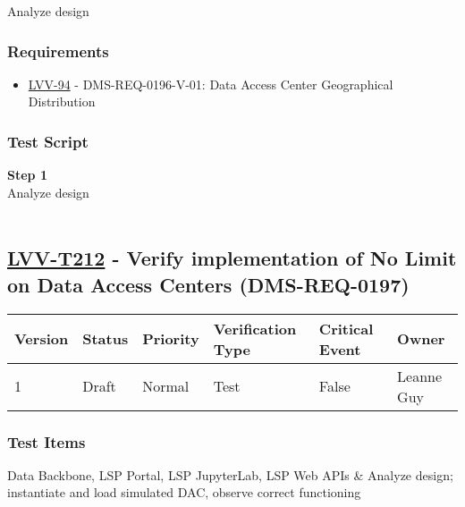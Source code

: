 Analyze design

\hypertarget{requirements-188}{%
\subsubsection{Requirements}\label{requirements-188}}

\begin{itemize}
\tightlist
\item
  \href{https://jira.lsstcorp.org/browse/LVV-94}{LVV-94} -
  DMS-REQ-0196-V-01: Data Access Center Geographical Distribution
\end{itemize}

\hypertarget{test-script-188}{%
\subsubsection{Test Script}\label{test-script-188}}

\textbf{Step 1}\\
Analyze design\\
~\\

\hypertarget{lvv-t212---verify-implementation-of-no-limit-on-data-access-centers-dms-req-0197}{%
\subsection{\texorpdfstring{\href{https://jira.lsstcorp.org/secure/Tests.jspa\#/testCase/LVV-T212}{LVV-T212}
- Verify implementation of No Limit on Data Access Centers
(DMS-REQ-0197)}{LVV-T212 - Verify implementation of No Limit on Data Access Centers (DMS-REQ-0197)}}\label{lvv-t212---verify-implementation-of-no-limit-on-data-access-centers-dms-req-0197}}

\begin{longtable}[]{@{}llllll@{}}
\toprule
Version & Status & Priority & Verification Type & Critical Event &
Owner\tabularnewline
\midrule
\endhead
1 & Draft & Normal & Test & False & Leanne Guy\tabularnewline
\bottomrule
\end{longtable}

\hypertarget{test-items-188}{%
\subsubsection{Test Items}\label{test-items-188}}

Data Backbone, LSP Portal, LSP JupyterLab, LSP Web APIs \& Analyze
design; instantiate and load simulated DAC, observe correct functioning

